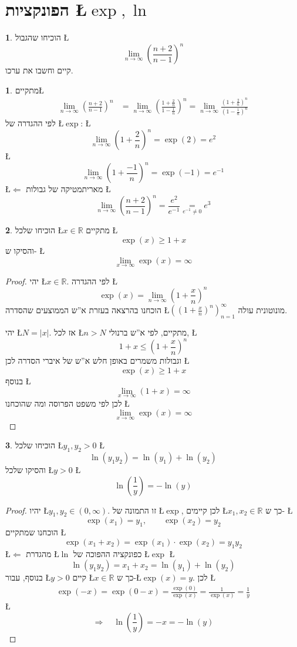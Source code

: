 \documentclass[english,hebrew]{article}
\theoremstyle{definition}
\newtheorem*{problem*}{\protect\problemname}
\theoremstyle{definition}
\newtheorem*{sol*}{\protect\solutionname}
\providecommand{\problemname}{בעיה}
\providecommand{\solutionname}{פתרון}
\begin{document}
\part{הפונקציות \L{$\exp,\ln$}}
\begin{problem*}
הוכיחו שהגבול \L{%
\[
\lim_{n\to\infty}\left(\frac{n+2}{n-1}\right)^{n}
\]
}%
קיים וחשבו את ערכו.
\end{problem*}
\begin{sol*}
מתקיים\L{%
\begin{align*}
\lim_{n\to\infty}\left(\frac{n+2}{n-1}\right)^{n} & =\lim_{n\to\infty}\left(\frac{1+\frac{2}{n}}{1-\frac{1}{n}}\right)^{n}=\lim_{n\to\infty}\frac{\left(1+\frac{2}{n}\right)^{n}}{\left(1-\frac{1}{n}\right)^{n}}
\end{align*}
}%
לפי ההגדרה של \L{$\exp$}: \L{%
\[
\lim_{n\to\infty}\left(1+\frac{2}{n}\right)^{n}=\exp(2)=e^{2}
\]
}%
\L{%
\[
\lim_{n\to\infty}\left(1+\frac{-1}{n}\right)^{n}=\exp(-1)=e^{-1}
\]
}%
\L{$\Leftarrow$} מאריתמטיקה של גבולות \L{%
\[
\lim_{n\to\infty}\left(\frac{n+2}{n-1}\right)^{n}=\frac{e^{2}}{e^{-1}}\underset{e^{-1}\ne0}{=}e^{3}
\]
}%
\end{sol*}
\begin{problem*}
הוכיחו שלכל \L{$x\in\mathbb{R}$} מתקיים \L{%
\[
\exp(x)\ge1+x
\]
}%
והסיקו ש- \L{%
\[
\lim_{x\to\infty}\exp(x)=\infty
\]
}%
\end{problem*}
\begin{proof}
יהי \L{$x\in\mathbb{R}$}. לפי ההגדרה \L{%
\[
\exp(x)=\lim_{n\to\infty}\left(1+\frac{x}{n}\right)^{n}
\]
}%
הוכחנו בהרצאה בעזרת א\textquotedblright ש הממוצעים שהסדרה \L{$\left(\left(1+\frac{x}{n}\right)^{n}\right)_{n=1}^{\infty}$}
מונוטונית עולה. 

יהי \L{$N=\left|x\right|$}. אז לכל \L{$n>N$} מתקיים, לפי א\textquotedblright ש
ברנולי, \L{%
\[
1+x\le\left(1+\frac{x}{n}\right)^{n}
\]
}%
וגבולות משמרים באופן חלש א\textquotedblright ש של איברי הסדרה לכן
\L{%
\[
\exp(x)\ge1+x
\]
}%
בנוסף \L{%
\[
\lim_{x\to\infty}(1+x)=\infty
\]
}%
לכן לפי משפט הפרוסה ומה שהוכחנו \L{%
\[
\lim_{x\to\infty}\exp(x)=\infty
\]
}%
\end{proof}
\begin{problem*}
הוכיחו שלכל \L{$y_{1},y_{2}>0$} \L{%
\[
\ln(y_{1}y_{2})=\ln(y_{1})+\ln(y_{2})
\]
}%
והסיקו שלכל \L{$y>0$} \L{%
\[
\ln\!\left(\frac{1}{y}\right)=-\ln(y)
\]
}%
\end{problem*}
\begin{proof}
יהיו \L{$y_{1},y_{2}\in(0,\infty)$}. זו התמונה של \L{$\exp$}, לכן
קיימים \L{$x_{1},x_{2}\in\mathbb{R}$} כך ש- \L{%
\[
\exp(x_{1})=y_{1},\qquad\exp(x_{2})=y_{2}
\]
}%
הוכחנו שמתקיים \L{%
\[
\exp(x_{1}+x_{2})=\exp(x_{1})\cdot\exp(x_{2})=y_{1}y_{2}
\]
}%
\L{$\Leftarrow$} מהגדרת \L{$\ln$} כפונקציה ההפוכה של \L{$\exp$}
\L{%
\[
\ln(y_{1}y_{2})=x_{1}+x_{2}=\ln(y_{1})+\ln(y_{2})
\]
}%
בנוסף, עבור \L{$y>0$} קיים \L{$x\in\mathbb{R}$} כך ש-\L{$\exp(x)=y$}.
לכן \L{%
\begin{align*}
\exp(-x)=\exp(0-x)=\frac{\exp(0)}{\exp(x)}=\frac{1}{\exp(x)}=\frac{1}{y}
\end{align*}
}%
\L{%
\[
\Rightarrow\quad\ln\!\left(\frac{1}{y}\right)=-x=-\ln(y)
\]
}%
\end{proof}
\end{document}
